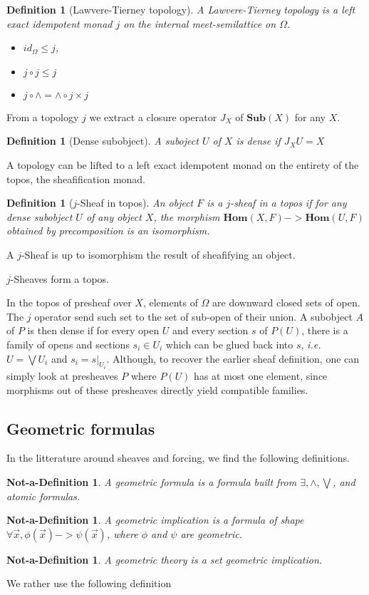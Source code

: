 \documentclass[11pt]{article}
\newtheorem{definition}[theorem]{Definition}
\newtheorem{ndefinition}[theorem]{Not-a-Definition}
\newcommand{\0}{\mathbf{0}}
\newcommand{\1}{\mathbf{1}}
\begin{document}
\begin{definition}[Lawvere-Tierney topology]
    A \emph{Lawvere-Tierney topology} is a left exact idempotent monad $j$ on the internal meet-semilattice on $\Omega$.
\begin{itemize}
    \item $ id_\Omega \leq j $,
    \item $ j\circ j \leq  j$
    \item $ j \circ \wedge = \wedge \circ j\times j$
\end{itemize}
\end{definition}

From a topology $j$ we extract a closure operator $J_X$ of $\mathbf{Sub}(X)$ for any $X$.
\begin{definition}[Dense subobject]
    A suboject $U$ of $X$ is dense if $J_XU  = X$
\end{definition}

A topology can be lifted to a left exact idempotent monad on the entirety of the topos, the sheafification monad.

\begin{definition}[$j$-Sheaf in topos]
    An object $F$ is a $j$-\emph{sheaf} in a topos if for any dense subobject $U$ of any object $X$, the morphism $\mathbf{Hom}(X, F) -> \mathbf{Hom}(U, F)$ obtained by precomposition is an isomorphism.
\end{definition}

A $j$-Sheaf is up to isomorphism the result of sheafifying an object.

$j$-Sheaves form a topos.

In the topos of presheaf over $X$, elements of $\Omega$ are downward closed sets of open. The $j$ operator send such set to the set of sub-open of their union. A subobject $A$ of $P$ is then dense if for every open $U$ and every section $s$ of $P(U)$, there is a family of opens and sections $s_i\in U_i$ which can be glued back into $s$, \emph{i.e.} $U = \bigvee U_i$ and $s_i = s|_{U_i}$. Although, to recover the earlier sheaf definition, one can simply look at presheaves $P$ where $P(U)$ has at most one element, since morphisms out of these presheaves directly yield compatible families.

\subsection{Geometric formulas}
In the litterature around sheaves and forcing, we find the following definitions.
\begin{ndefinition}
A \emph{geometric formula} is a formula built from $\exists, \wedge,\bigvee$, and atomic formulas.
\end{ndefinition}
\begin{ndefinition}
A \emph{geometric implication} is a formula of shape $\forall \overrightarrow{x}, \phi(\overrightarrow{x}) -> \psi(\overrightarrow{x})$, where $\phi$ and $\psi$ are geometric.
\end{ndefinition}
\begin{ndefinition}
    A \emph{geometric theory} is a set geometric implication.
\end{ndefinition}
We rather use the following definition
\end{document}
